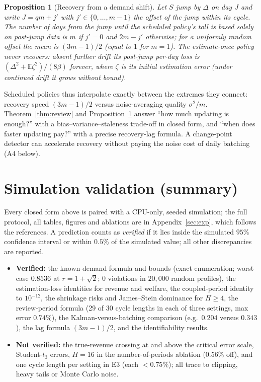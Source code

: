 \documentclass[11pt]{article}
\newtheorem{proposition}[theorem]{Proposition}
\theoremstyle{definition}
\theoremstyle{remark}
\newcommand{\E}{\mathbb{E}}
\begin{document}
\begin{proposition}[Recovery from a demand shift]\label{prop:recovery}
Let $S$ jump by $\Delta$ on day $J$ and write $J=qm+j'$ with $j'\in\{0,\dots,m-1\}$ the offset of the jump within its cycle. The number of days from the jump until the scheduled policy's toll is based solely on post-jump data is $m$ if $j'=0$ and $2m-j'$ otherwise; for a uniformly random offset the mean is $(3m-1)/2$ (equal to $1$ for $m=1$). The estimate-once policy never recovers: absent further drift its post-jump per-day loss is $(\Delta^2+\E\zeta^2)/(8\beta)$ forever, where $\zeta$ is its initial estimation error (under continued drift it grows without bound).
\end{proposition}
Scheduled policies thus interpolate exactly between the extremes they connect: recovery speed $(3m-1)/2$ versus noise-averaging quality $\sigma^2/m$. Theorem~\ref{thm:review} and Proposition~\ref{prop:recovery} answer ``how much updating is enough?'' with a bias--variance--staleness trade-off in closed form, and ``when does faster updating pay?'' with a precise recovery-lag formula. A change-point detector can accelerate recovery without paying the noise cost of daily batching (A4 below).

\section{Simulation validation (summary)}\label{sec:expsum}
Every closed form above is paired with a CPU-only, seeded simulation; the full protocol, all tables, figures and ablations are in Appendix~\ref{sec:exp}, which follows the references. A prediction counts as \emph{verified} if it lies inside the simulated $95\%$ confidence interval or within $0.5\%$ of the simulated value; all other discrepancies are reported.
\begin{itemize}
\item \textbf{Verified:} the known-demand formula and bounds (exact enumeration; worst case $0.8536$ at $r=1+\sqrt2$; $0$ violations in $20{,}000$ random profiles), the estimation-loss identities for revenue and welfare, the coupled-period identity to $10^{-12}$, the shrinkage risks and James--Stein dominance for $H\ge4$, the review-period formula (29 of 30 cycle lengths in each of three settings, max error $0.74\%$), the Kalman-versus-batching comparison (e.g.\ $0.204$ versus $0.343$), the lag formula $(3m-1)/2$, and the identifiability results.
\item \textbf{Not verified:} the true-revenue crossing at and above the critical error scale, Student-$t_3$ errors, $H=16$ in the number-of-periods ablation ($0.56\%$ off), and one cycle length per setting in E3 (each $<0.75\%$); all trace to clipping, heavy tails or Monte Carlo noise.
\end{itemize}
\end{document}
